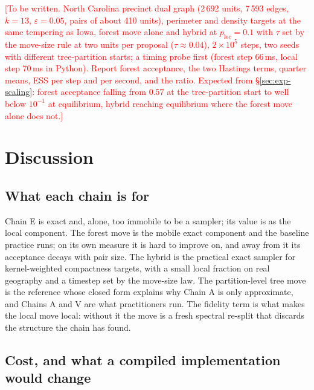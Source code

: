 \documentclass[11pt]{article}
\newcommand{\todo}[1]{\textcolor{red}{[#1]}}
\begin{document}
\todo{To be written. North Carolina precinct dual graph (2\,692 units,
7\,593 edges, $k = 13$, $\varepsilon = 0.05$, pairs of about 410
units), perimeter and density targets at the same tempering as Iowa,
forest move alone and hybrid at $p_{\mathrm{loc}} = 0.1$ with $\tau$
set by the move-size rule at two units per proposal
($\tau \approx 0.04$), $2 \times 10^5$ steps, two seeds with
different tree-partition starts; a timing probe first (forest step
66\,ms, local step 70\,ms in Python). Report forest acceptance, the
two Hastings terms, quarter means, ESS per step and per second, and
the ratio. Expected from \S\ref{sec:exp-scaling}: forest acceptance
falling from $0.57$ at the tree-partition start to well below
$10^{-1}$ at equilibrium, hybrid reaching equilibrium where the forest
move alone does not.}

\section{Discussion}\label{sec:discussion}

\subsection{What each chain is for}\label{sec:disc-roles}

Chain E is exact and, alone, too immobile to be a sampler; its value is
as the local component. The forest move is the mobile exact component
and the baseline practice runs; on its own measure it is hard to
improve on, and away from it its acceptance decays with pair size. The
hybrid is the practical exact sampler for kernel-weighted compactness
targets, with a small local fraction on real geography and a timestep
set by the move-size law. The partition-level tree move is the
reference whose closed form explains why Chain A is only approximate,
and Chains A and V are what practitioners run. The fidelity term is
what makes the local move local: without it the move is a fresh
spectral re-split that discards the structure the chain has found.

\subsection{Cost, and what a compiled implementation would change}\label{sec:disc-cost}
\end{document}
